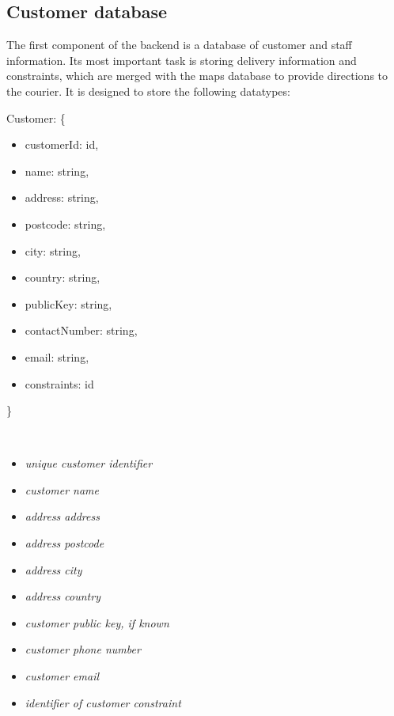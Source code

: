 \subsection{Customer database}
\begin{flushleft}
The first component of the backend is a database of customer and staff information. Its most important task is storing delivery information and constraints, which are merged with the maps database to provide directions to the courier. It is designed to store the following datatypes:
\end{flushleft}
\begin{minipage}{6.5cm}
    Customer: \{
    \begin{itemize} 
        \itemsep-0.5em
        \item[] customerId: id,
        \item[] name: string,
        \item[] address: string,
        \item[] postcode: string,
        \item[] city: string,
        \item[] country: string,
        \item[] publicKey: string,
        \item[] contactNumber: string,
        \item[] email: string,
        \item[] constraints: id
    \end{itemize}
    \}
\end{minipage}
\begin{minipage}{10cm}
    \hspace{1cm} \\
    \begin{itemize}
        \itemsep-0.5em
        \item[] \textit{unique customer identifier}
        \item[] \textit{customer name}
        \item[] \textit{address address}
        \item[] \textit{address postcode}
        \item[] \textit {address city}
        \item[] \textit{address country}
        \item[] \textit{customer public key, if known}
        \item[] \textit{customer phone number}
        \item[] \textit{customer email}
        \item[] \textit{identifier of customer constraint}
    \end{itemize}
    \hspace{1cm} \\
\end{minipage}
